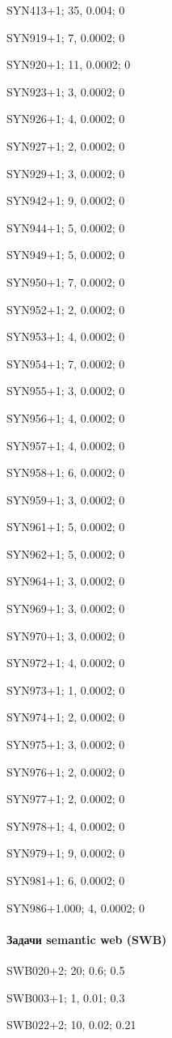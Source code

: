 SYN413+1; 35, 0.004; 0

SYN919+1; 7, 0.0002; 0

SYN920+1; 11, 0.0002; 0

SYN923+1; 3, 0.0002; 0

SYN926+1; 4, 0.0002; 0

SYN927+1; 2, 0.0002; 0

SYN929+1; 3, 0.0002; 0

SYN942+1; 9, 0.0002; 0

SYN944+1; 5, 0.0002; 0

SYN949+1; 5, 0.0002; 0

SYN950+1; 7, 0.0002; 0

SYN952+1; 2, 0.0002; 0

SYN953+1; 4, 0.0002; 0

SYN954+1; 7, 0.0002; 0

SYN955+1; 3, 0.0002; 0

SYN956+1; 4, 0.0002; 0

SYN957+1; 4, 0.0002; 0

SYN958+1; 6, 0.0002; 0

SYN959+1; 3, 0.0002; 0

SYN961+1; 5, 0.0002; 0

SYN962+1; 5, 0.0002; 0

SYN964+1; 3, 0.0002; 0

SYN969+1; 3, 0.0002; 0

SYN970+1; 3, 0.0002; 0

SYN972+1; 4, 0.0002; 0

SYN973+1; 1, 0.0002; 0

SYN974+1; 2, 0.0002; 0

SYN975+1; 3, 0.0002; 0

SYN976+1; 2, 0.0002; 0

SYN977+1; 2, 0.0002; 0

SYN978+1; 4, 0.0002; 0

SYN979+1; 9, 0.0002; 0

SYN981+1; 6, 0.0002; 0

SYN986+1.000; 4, 0.0002; 0

\paragraph{Задачи semantic web (SWB)}

SWB020+2; 20; 0.6; 0.5

SWB003+1; 1, 0.01; 0.3

SWB022+2; 10, 0.02; 0.21

